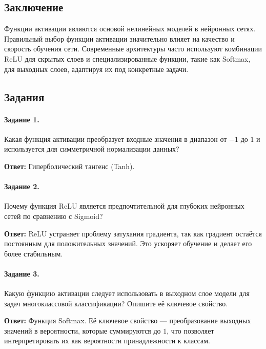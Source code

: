 \subsection*{Заключение}
Функции активации являются основой нелинейных моделей в нейронных сетях. Правильный выбор функции активации значительно влияет на качество и скорость обучения сети. Современные архитектуры часто используют комбинации ReLU для скрытых слоев и специализированные функции, такие как Softmax, для выходных слоев, адаптируя их под конкретные задачи.

\subsection*{Задания}

\paragraph{Задание 1.} Какая функция активации преобразует входные значения в диапазон от $-1$ до $1$ и используется для симметричной нормализации данных?

\textbf{Ответ:} Гиперболический тангенс (Tanh).

\paragraph{Задание 2.} Почему функция ReLU является предпочтительной для глубоких нейронных сетей по сравнению с Sigmoid?

\textbf{Ответ:} ReLU устраняет проблему затухания градиента, так как градиент остаётся постоянным для положительных значений. Это ускоряет обучение и делает его более стабильным.

\paragraph{Задание 3.} Какую функцию активации следует использовать в выходном слое модели для задач многоклассовой классификации? Опишите её ключевое свойство.

\textbf{Ответ:} Функция Softmax. Её ключевое свойство — преобразование выходных значений в вероятности, которые суммируются до $1$, что позволяет интерпретировать их как вероятности принадлежности к классам.

